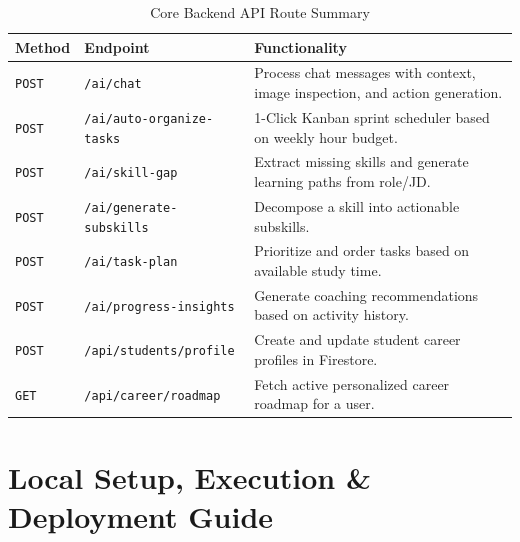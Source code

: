 ﻿\documentclass[11pt,a4paper]{article}
\begin{document}
\begin{table}[H]
\centering
\small
\begin{tabularx}{\textwidth}{l l X}
\toprule
\textbf{Method} & \textbf{Endpoint} & \textbf{Functionality} \\
\midrule
\texttt{POST} & \texttt{/ai/chat} & Process chat messages with context, image inspection, and action generation. \\
\texttt{POST} & \texttt{/ai/auto-organize-tasks} & 1-Click Kanban sprint scheduler based on weekly hour budget. \\
\texttt{POST} & \texttt{/ai/skill-gap} & Extract missing skills and generate learning paths from role/JD. \\
\texttt{POST} & \texttt{/ai/generate-subskills} & Decompose a skill into actionable subskills. \\
\texttt{POST} & \texttt{/ai/task-plan} & Prioritize and order tasks based on available study time. \\
\texttt{POST} & \texttt{/ai/progress-insights} & Generate coaching recommendations based on activity history. \\
\texttt{POST} & \texttt{/api/students/profile} & Create and update student career profiles in Firestore. \\
\texttt{GET}  & \texttt{/api/career/roadmap} & Fetch active personalized career roadmap for a user. \\
\bottomrule
\end{tabularx}
\caption{Core Backend API Route Summary}
\end{table}

\newpage

\section{Local Setup, Execution \& Deployment Guide}
\end{document}
